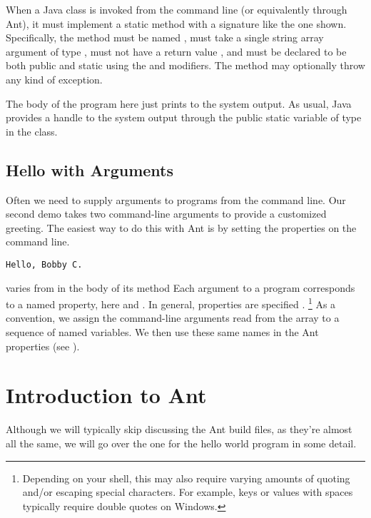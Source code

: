 When a Java class is invoked from the command line (or equivalently
through Ant), it must implement a static method with a signature like
the one shown.  Specifically, the method must be named ,
must take a single string array argument of type , must
not have a return value , and must be
declared to be both public and static using the
 and  modifiers.  The method may optionally throw
any kind of exception.

The body of the program here just prints  to the
system output.  As usual, Java provides a handle to the system output
through the public static variable  of type
 in the  class.

\subsection{Hello with Arguments}

Often we need to supply arguments to programs from the command line.  
Our second demo  takes two 
command-line arguments  
to provide a customized greeting.
The easiest way to do this with Ant is by setting the
properties on the command line.
%
\begin{verbatim} 
Hello, Bobby C.
\end{verbatim}
%
 varies from 
in the body of its  method
%
%
Each argument to a program corresponds to a named property, here
 and .  In general, properties are specified
.%
%
\footnote{Depending on your shell, this may also require varying
  amounts of quoting and/or escaping special characters.  For example,
  keys or values with spaces typically require double quotes on
  Windows.}
%
As a convention, we assign the command-line arguments read
from the array  to a sequence of named variables.  
We then use these same names in the Ant properties (see ).


\section{Introduction to Ant}

Although we will typically skip discussing the Ant build files,
as they're almost all the same, we will go over the one for the
hello world program in some detail.  


